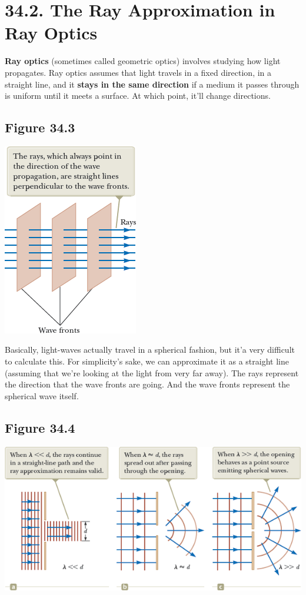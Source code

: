 \documentclass[12pt, letterpaper]{article}
\begin{document}
\section*{34.2. The Ray Approximation in Ray Optics}
\normalsize\textbf{Ray optics} (sometimes called geometric optics) involves studying how light propagates. Ray optics assumes that light travels in a fixed direction, in a straight line, and it \textbf{stays in the same direction} if a medium it passes through is uniform until it meets a surface. At which point, it'll change directions. 

\subsection*{Figure 34.3}
\begin{center}
    \includegraphics{34.3.png}
\end{center}
Basically, light-waves actually travel in a spherical fashion, but it'a very difficult to calculate this. For simplicity's sake, we can approximate it as a straight line (assuming that we're looking at the light from very far away). The rays represent the direction that the wave fronts are going. And the wave fronts represent the spherical wave itself.

\subsection*{Figure 34.4}
\begin{center}
    \includegraphics{34.4.png}
\end{center}
\end{document}
